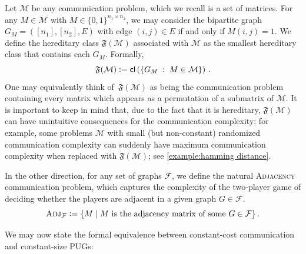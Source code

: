 \documentclass{article}
\newcommand{\define}{\vcentcolon=}
\newcommand{\zo}{\{0,1\}}
\newcommand{\cF}{\ensuremath{\mathcal{F}}}
\newcommand{\cM}{\ensuremath{\mathcal{M}}}
\newcommand{\Adj}{\textsc{Adj}}
\newcommand{\cl}{\mathsf{cl}}
\begin{document}
Let $\cM$ be any communication problem, which we recall is a set of matrices. For any $M \in \cM$
with $M \in \zo^{n_1 \times n_2}$, we may consider the bipartite graph $G_M = ([n_1], [n_2], E)$
with edge $(i,j) \in E$ if and only if $M(i,j) = 1$.  We define the hereditary class
$\mathfrak{F}(\cM)$ associated with $\cM$ as the smallest hereditary class that contains each $G_M$. Formally,
\[
  \mathfrak{F}(\cM) \define \cl\left( \{ G_M \;:\; M \in \cM \} \right) \,.
\]
One may equivalently think of $\,\mathfrak{F}(\cM)$ as being the communication problem containing
every matrix which appears as a permutation of a submatrix of $\cM$.  It is important to keep in
mind that, due to the fact that it is hereditary, $\mathfrak{F}(\cM)$ can have unintuitive
consequences for the communication complexity: for example, some problems $\cM$ with small (but
non-constant) randomized communication complexity can suddenly have maximum communication complexity
when replaced with $\mathfrak{F}(\cM)$; see \cref{example:hamming distance}.

In the other direction, for any set of graphs $\cF$, we define the natural \textsc{Adjacency}
communication problem, which captures the complexity of the two-player game of deciding
whether the players are adjacent in a given graph $G \in \cF$. 
\[
  \Adj_\cF \define \{ M \;|\; M \text{ is the adjacency matrix of some } G\in \cF \} \,.
\]

We may now state the formal equivalence between constant-cost communication and constant-size PUGs:
\end{document}
